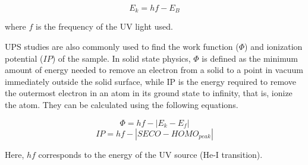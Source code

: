 \documentclass[12pt]{article}
\begin{document}
\begin{equation}
    E_k = hf - E_B
    \label{eqn:energy_conservation}
\end{equation}

\noindent where $f$ is the frequency of the UV light used.
\vspace{7pt}

UPS studies are also commonly used to find the work function ($\Phi$) and ionization potential ($IP$) of the sample. In solid state physics, $\Phi$ is defined as the minimum amount of energy needed to remove an electron from a solid to a point in vacuum immediately outside the solid surface, while IP is the energy required to remove the outermost electron in an atom in its ground state to infinity, that is, ionize the atom. They can be calculated using the following equations.

\begin{equation}
    \Phi = hf - |E_k - E_f|
    \label{eqn:phi}
\end{equation}
\begin{equation}
    IP = hf - |SECO - HOMO_{peak}|
    \label{eqn:IP}
\end{equation}

Here, $hf$ corresponds to the energy of the UV source (He-I transition).
\end{document}
